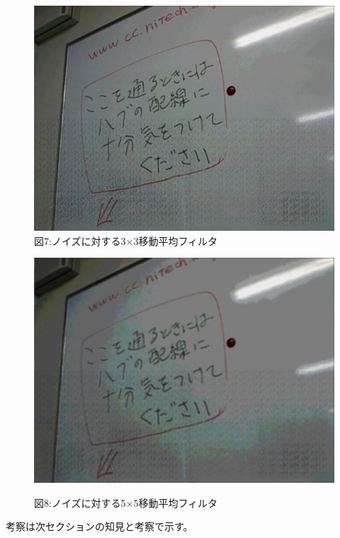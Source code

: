 ﻿\documentclass[a4j,11pt]{jarticle}
\begin{document}
\begin{figure}[tb]
 \begin{minipage}{0.49\hsize} %
   \center
   \includegraphics[width=\hsize]{./eps/smooth-noiz-movingAverage-dim3.eps}
   図7:ノイズに対する3$\times$3移動平均フィルタ
 \end{minipage}
 \begin{minipage}{0.49\hsize} %
   \center
   \includegraphics[width=\hsize]{./eps/smooth-noiz-movingAverage-dim5.eps}

   図8:ノイズに対する5$\times$5移動平均フィルタ
 \end{minipage}
 \label{fig:affine2}
\end{figure}
考察は次セクションの知見と考察で示す。
\end{document}
